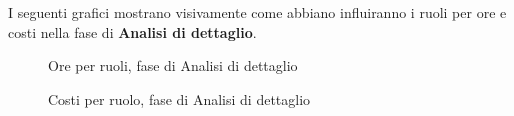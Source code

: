 I seguenti grafici mostrano visivamente come abbiano influiranno i ruoli per ore e costi nella fase di \textbf{Analisi di dettaglio}.
\begin{figure}[H]
	\centering
	\caption{Ore per ruoli, fase di Analisi di dettaglio}
\end{figure}
\begin{figure}[H]
	\centering
	\caption{Costi per ruolo, fase di Analisi di dettaglio}
\end{figure}

